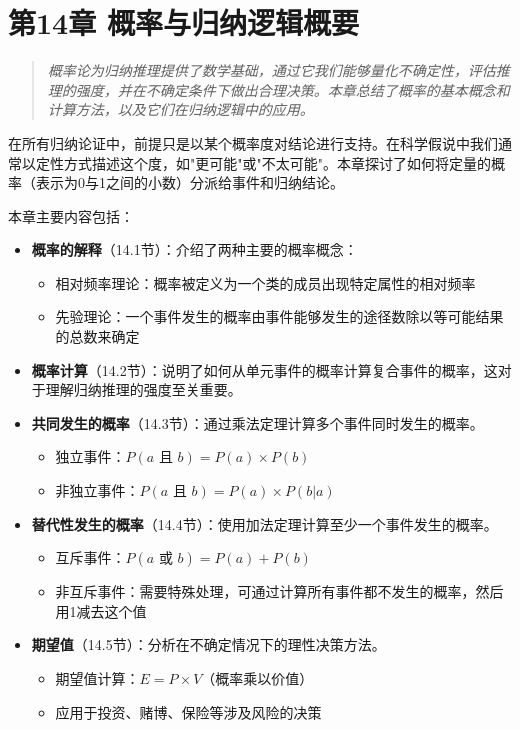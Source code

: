 \section{第14章 概率与归纳逻辑概要}

\begin{quotation}
\textit{概率论为归纳推理提供了数学基础，通过它我们能够量化不确定性，评估推理的强度，并在不确定条件下做出合理决策。本章总结了概率的基本概念和计算方法，以及它们在归纳逻辑中的应用。}
\end{quotation}

在所有归纳论证中，前提只是以某个概率度对结论进行支持。在科学假说中我们通常以定性方式描述这个度，如"更可能"或"不太可能"。本章探讨了如何将定量的概率（表示为0与1之间的小数）分派给事件和归纳结论。

本章主要内容包括：

\begin{itemize}
\item \textbf{概率的解释}（14.1节）：介绍了两种主要的概率概念：
  \begin{itemize}
  \item 相对频率理论：概率被定义为一个类的成员出现特定属性的相对频率
  \item 先验理论：一个事件发生的概率由事件能够发生的途径数除以等可能结果的总数来确定
  \end{itemize}

\item \textbf{概率计算}（14.2节）：说明了如何从单元事件的概率计算复合事件的概率，这对于理解归纳推理的强度至关重要。

\item \textbf{共同发生的概率}（14.3节）：通过乘法定理计算多个事件同时发生的概率。
  \begin{itemize}
  \item 独立事件：$P(a \text{ 且 } b) = P(a) \times P(b)$
  \item 非独立事件：$P(a \text{ 且 } b) = P(a) \times P(b|a)$
  \end{itemize}

\item \textbf{替代性发生的概率}（14.4节）：使用加法定理计算至少一个事件发生的概率。
  \begin{itemize}
  \item 互斥事件：$P(a \text{ 或 } b) = P(a) + P(b)$
  \item 非互斥事件：需要特殊处理，可通过计算所有事件都不发生的概率，然后用1减去这个值
  \end{itemize}

\item \textbf{期望值}（14.5节）：分析在不确定情况下的理性决策方法。
  \begin{itemize}
  \item 期望值计算：$E = P \times V$（概率乘以价值）
  \item 应用于投资、赌博、保险等涉及风险的决策
  \end{itemize}
\end{itemize}

